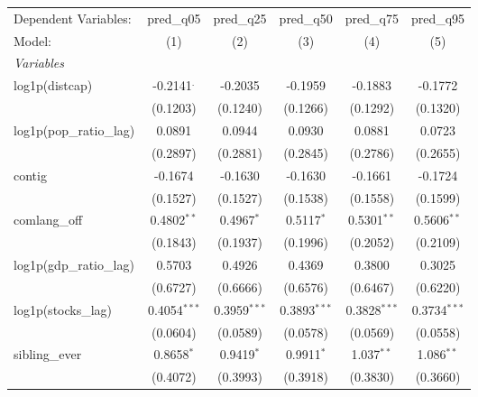 
\begingroup
\centering
\begin{tabular}{lccccc}
   \tabularnewline \midrule \midrule
   Dependent Variables:          & pred\_q05      & pred\_q25      & pred\_q50      & pred\_q75      & pred\_q95\\   
   Model:                        & (1)            & (2)            & (3)            & (4)            & (5)\\  
   \midrule
   \emph{Variables}\\
   log1p(distcap)                & -0.2141$^{.}$  & -0.2035        & -0.1959        & -0.1883        & -0.1772\\   
                                 & (0.1203)       & (0.1240)       & (0.1266)       & (0.1292)       & (0.1320)\\   
   log1p(pop\_ratio\_lag)        & 0.0891         & 0.0944         & 0.0930         & 0.0881         & 0.0723\\   
                                 & (0.2897)       & (0.2881)       & (0.2845)       & (0.2786)       & (0.2655)\\   
   contig                        & -0.1674        & -0.1630        & -0.1630        & -0.1661        & -0.1724\\   
                                 & (0.1527)       & (0.1527)       & (0.1538)       & (0.1558)       & (0.1599)\\   
   comlang\_off                  & 0.4802$^{**}$  & 0.4967$^{*}$   & 0.5117$^{*}$   & 0.5301$^{**}$  & 0.5606$^{**}$\\   
                                 & (0.1843)       & (0.1937)       & (0.1996)       & (0.2052)       & (0.2109)\\   
   log1p(gdp\_ratio\_lag)        & 0.5703         & 0.4926         & 0.4369         & 0.3800         & 0.3025\\   
                                 & (0.6727)       & (0.6666)       & (0.6576)       & (0.6467)       & (0.6220)\\   
   log1p(stocks\_lag)            & 0.4054$^{***}$ & 0.3959$^{***}$ & 0.3893$^{***}$ & 0.3828$^{***}$ & 0.3734$^{***}$\\   
                                 & (0.0604)       & (0.0589)       & (0.0578)       & (0.0569)       & (0.0558)\\   
   sibling\_ever                 & 0.8658$^{*}$   & 0.9419$^{*}$   & 0.9911$^{*}$   & 1.037$^{**}$   & 1.086$^{**}$\\   
                                 & (0.4072)       & (0.3993)       & (0.3918)       & (0.3830)       & (0.3660)\\   

\end{tabular}
